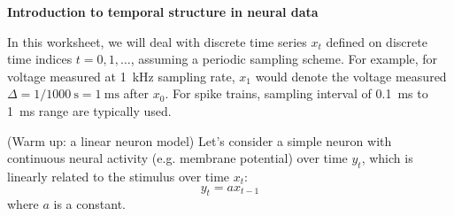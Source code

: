 \documentclass[letterpaper,11pt]{exam}
\DeclareMathOperator*{\E}{\mathbb{E}} %
\newcommand{\iidsample}{\stackrel{iid}{\sim}}
\newcommand{\normalDist}{\mathcal{N}}
\newcommand{\funfact}{\textbf{Fun Fact:}~}
\begin{document}
\vspace{-5mm}
\begin{center}
\textbf{\large
    Introduction to temporal structure in neural data
}
\end{center}

In this worksheet, we will deal with discrete time series $x_t$ defined on discrete time indices $t = 0, 1, \ldots$, assuming a periodic sampling scheme.
For example, for voltage measured at \SI{1}{\kilo\hertz} sampling rate, $x_1$ would denote the voltage measured $\Delta = 1/1000~\unit{\second} = \SI{1}{\milli\second}$ after $x_0$.
For spike trains, sampling interval of \SI{0.1}{\milli\second} to \SI{1}{\milli\second} range are typically used.

\begin{questions}
\question (Warm up: a linear neuron model)
Let's consider a simple neuron with continuous neural activity (e.g. membrane potential) over time $y_t$, which is linearly related to the stimulus over time $x_t$:
\begin{equation}\label{eq:linearneuron:1}
    y_{t} = a x_{t-1}
\end{equation}
where $a$ is a constant.
\end{questions}
\end{document}
